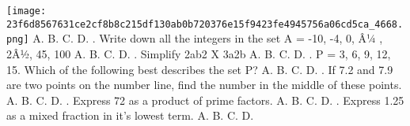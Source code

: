 \documentclass{article}
\begin{document}
\begin{multicols}{2}
  \texttt{[image: 23f6d8567631ce2cf8b8c215df130ab0b720376e15f9423fe4945756a06cd5ca\_4668.png]}
 \newline \indent A. \newline \indent B. \newline \indent C. \newline \indent D.  \newline{}. Write down all the integers in the set A = {-10, -4, 0, Â¼ , 2Â½, 45, 100} \newline \indent A. \newline \indent B. \newline \indent C. \newline \indent D.  \newline{}. Simplify 2ab2 X 3a2b \newline \indent A. \newline \indent B. \newline \indent C. \newline \indent D.  \newline{}.  P = {3, 6, 9, 12, 15}. Which of the following best describes the set P? \newline \indent A. \newline \indent B. \newline \indent C. \newline \indent D.  \newline{}.  If 7.2 and 7.9 are two points on the number line, find the number in the middle of these points. \newline \indent A. \newline \indent B. \newline \indent C. \newline \indent D.  \newline{}. Express 72 as a product of prime factors. \newline \indent A. \newline \indent B. \newline \indent C. \newline \indent D.  \newline{}. Express 1.25 as a mixed fraction in it's lowest term. \newline \indent A. \newline \indent B. \newline \indent C. \newline \indent D.  
\end{multicols}
\end{document}
